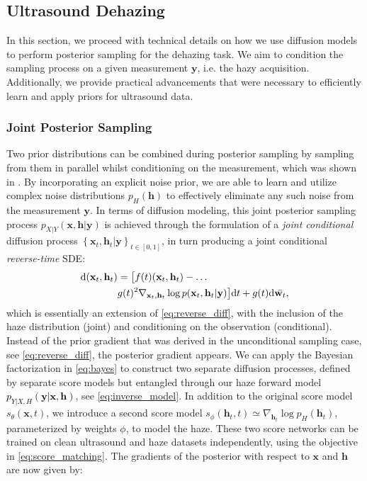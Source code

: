 \documentclass[journal,twoside,web]{ieeecolor}
\newcommand{\bx}{{\mathbf x}}
\newcommand{\by}{{\mathbf y}}
\newcommand{\bh}{{\mathbf h}}
\newcommand{\TSWR}[1]{{\textcolor{black}{#1}}}
\begin{document}
\subsection{Ultrasound Dehazing}
\label{sec:dehazing}
In this section, we proceed with technical details on how we use diffusion models to perform posterior sampling for the dehazing task. We aim to condition the sampling process on a given measurement $\by$, i.e. the hazy acquisition. Additionally, we provide practical advancements that were necessary to efficiently learn and apply priors for ultrasound data. 
\subsubsection{Joint Posterior Sampling}
Two prior distributions can be combined during posterior sampling by sampling from them in parallel whilst conditioning on the measurement, which was shown in \cite{stevensRemovingStructuredNoise2023}. By incorporating an explicit noise prior, we are able to learn and utilize complex noise distributions $p_H(\bh)$ to effectively eliminate any such noise from the measurement $\by$. In terms of diffusion modeling, this joint posterior sampling process $p_{X|Y}(\bx, \bh|\by)$ is achieved through the formulation of a \emph{joint conditional} diffusion process $\left\{\bx_t, \bh_t|\by\right\}_{t\in[0,1]}$, in turn producing a joint conditional \emph{reverse-time} SDE:
\begin{align}
    \mathrm{d}(\bx_t, \bh_t) &= 
    \big[
        f(t)(\bx_t, \bh_t) - \ldots \nonumber\\ &g(t)^2 
            \nabla_{\bx_t, \bh_t} \log{p(\bx_t, \bh_t|\by})
    \big] \mathrm{d}t + g(t) \mathrm{d}\Bar{\mathbf{w}_t},
    \label{eq:cond_reverse_diff}
\end{align}
which is essentially an extension of \ref{eq:reverse_diff}, with the inclusion of the haze distribution (joint) and conditioning on the observation (conditional). Instead of the prior gradient that was derived in the unconditional sampling case, see \eqref{eq:reverse_diff}, the posterior gradient appears. We can apply the Bayesian factorization in \eqref{eq:bayes} to construct two separate diffusion processes, defined by separate score models but entangled through our haze forward model \TSWR{$p_{Y|X,H}(\by|\bx, \bh)$}, see \eqref{eq:inverse_model}. In addition to the original score model $s_\theta(\bx, t)$, we introduce a second score model $s_\phi(\bh_t, t)\simeq \nabla_{\bh_t} \log p_H(\bh_t)$, parameterized by weights $\phi$, to model the haze. These two score networks can be trained on clean ultrasound and haze datasets independently, using the objective in \eqref{eq:score_matching}. The gradients of the posterior with respect to $\bx$ and $\bh$ are now given by:
\end{document}
